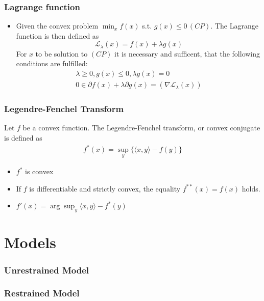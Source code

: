 \documentclass[utf8,aspectratio=169,ngerman,english]{beamer}
\begin{document}
\begin{frame}
\frametitle{Lagrange function}
 \begin{itemize}
    \item Given the convex problem $\min_x f(x)$ s.t. $g(x) \leq 0 \,(CP)$. The Lagrange function is then defined as
    \begin{equation}
    \mathcal L_\lambda(x) = f(x) + \lambda g(x)
    \end{equation}
    For $x$ to be solution to $(CP)$ it is necessary and sufficent, that the following conditions are fulfilled:
    \begin{align}
        \lambda \geq 0, g(x) \leq 0, \lambda g(x) = 0 \\
        0 \in \partial f(x) + \lambda \partial g(x) = (\nabla \mathcal L_\lambda(x))
    \end{align}
 \end{itemize}


\end{frame}

\begin{frame}
 \frametitle{Legendre-Fenchel Transform}
 Let $f$ be a convex function. The Legendre-Fenchel transform, or convex conjugate is defined as
 \begin{align}
  f^*(x) =  \sup_y\{\langle x, y\rangle - f(y) \}
 \end{align}
 \begin{itemize}
  \item $f^*$ is convex
  \item If $f$ is differentiable and strictly convex, the equality $f^{**}(x) = f(x)$ holds.
  \item $f'(x) = \arg \sup_y \langle x,y \rangle - f^*(y)$
 \end{itemize}


\end{frame}

\section{Models}
\begin{frame}
\frametitle{Unrestrained Model}

\end{frame}

\begin{frame}
\frametitle{Restrained Model}



\end{frame}
\end{document}
